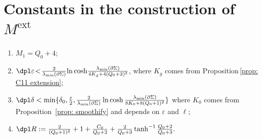 \documentclass[JEP,XML,SOM,Unicode,NoFloatCountersInSection]{cedram}
\newcommand{\ext}{\mathrm{ext}}
\theoremstyle{definition}
\let\eps\varepsilon
\renewcommand{\>}{{\rangle}}
\newcommand{\<}{{\langle}}
\begin{document}
\section{Constants in the construction of \texorpdfstring{$M^{\ext}$}{M}} \label{app: const_in_M_ext}

\begin{enumerate}\renewcommand{\theenumi}{C\arabic{enumi}}
\item  $M_1=Q_0+4$;
\item \label{cond: eps2} $\dpl\eps\!<\!\frac{2}{\lambda_{\min}(\partial\Sigma)}\!\ln\cosh\!\frac{\lambda_{\min}(\partial\Sigma)}{4K_g+4(Q_0+2)^2}$, where $K_g$ comes from \hbox{Proposition}\,\ref{prop: C11 extension};
\item\label{cond: delta2} $\dpl\delta<\min\{\delta_0,\frac{\eps}{2},\frac{2}{\lambda_{\min}(\partial\Sigma)}\ln\cosh\frac{\lambda_{\min}(\partial\Sigma)}{8K_0+8(Q_0+1)^2}\}$ where $K_0$ comes from Proposition~\ref{prop: smoothify} and depends on $\eps$ and $\ell$;
\item $\dpl R:=\frac{2}{(Q_0+1)^2}+1+\frac{C_0}{Q_0+2}+\frac{2}{Q_0+3}\tanh^{-1}\frac{Q_0+2}{Q_0+3}.$
\end{enumerate}

\backmatter


\end{document}
